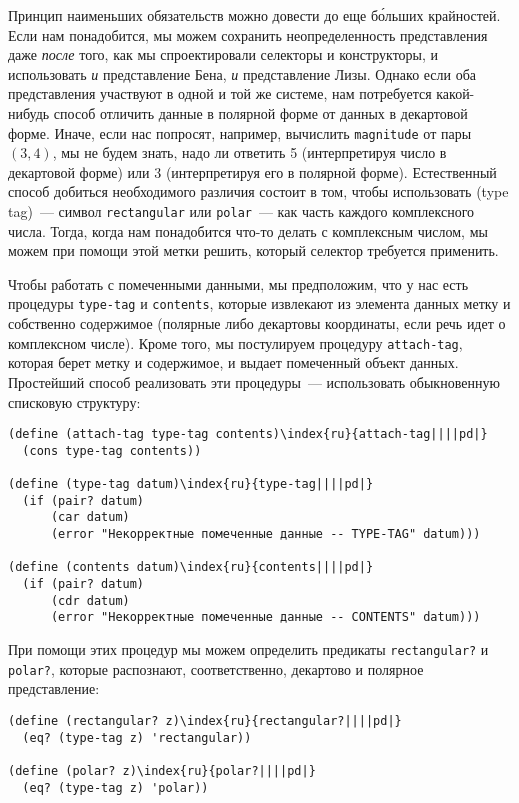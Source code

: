 Принцип наименьших обязательств можно довести до еще
б\'{о}льших крайностей.  Если нам понадобится, мы можем
сохранить неопределенность представления даже {\em после} того,
как мы спроектировали селекторы и конструкторы, и использовать
{\em и} представление Бена, {\em и} представление
Лизы.  Однако если оба представления участвуют в одной и той же
системе, нам потребуется какой-нибудь способ отличить данные в
полярной форме от данных в декартовой форме.  Иначе, если нас
попросят, например, вычислить {\tt magnitude} от пары 
$(3,4)$, мы не будем знать, надо ли ответить 5
(интерпретируя число в декартовой форме) или 3 (интерпретируя его в
полярной форме).  Естественный способ добиться необходимого различия
состоит в том, чтобы использовать 
 (type tag)~--- символ
{\tt rectangular} или {\tt polar}~--- как часть каждого
комплексного числа.  Тогда, когда нам понадобится что-то делать с
комплексным числом, мы можем при помощи этой метки решить, который
селектор требуется применить.

Чтобы работать с помеченными данными, мы предположим, что
у нас есть процедуры {\tt type-tag} и {\tt contents},
которые извлекают из элемента данных метку и собственно содержимое
(полярные либо декартовы координаты, если речь идет о комплексном
числе).  Кроме того, мы постулируем процедуру {\tt attach-tag},
которая берет метку и содержимое, и выдает помеченный объект данных.
Простейший способ реализовать эти процедуры~--- использовать
обыкновенную списковую структуру:

\begin{Verbatim}[fontsize=\small]
(define (attach-tag type-tag contents)\index{ru}{attach-tag||||pd|}
  (cons type-tag contents))

(define (type-tag datum)\index{ru}{type-tag||||pd|}
  (if (pair? datum)
      (car datum)
      (error "Некорректные помеченные данные -- TYPE-TAG" datum)))

(define (contents datum)\index{ru}{contents||||pd|}
  (if (pair? datum)
      (cdr datum)
      (error "Некорректные помеченные данные -- CONTENTS" datum)))
\end{Verbatim}

При помощи этих процедур мы можем определить предикаты
{\tt rec\-tan\-gu\-lar?} и {\tt polar?}, которые распознают,
соответственно, декартово и полярное представление:

\begin{Verbatim}[fontsize=\small]
(define (rectangular? z)\index{ru}{rectangular?||||pd|}
  (eq? (type-tag z) 'rectangular))

(define (polar? z)\index{ru}{polar?||||pd|}
  (eq? (type-tag z) 'polar))
\end{Verbatim}


